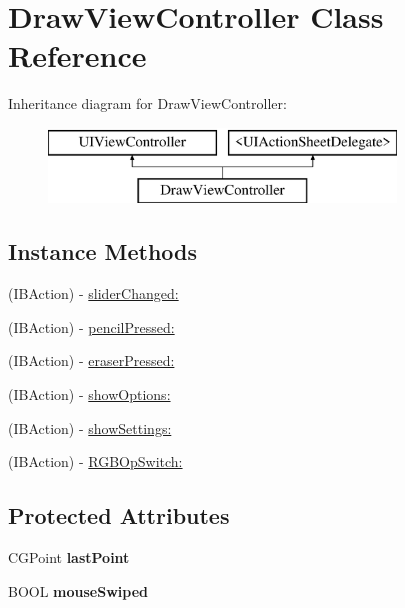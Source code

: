 \hypertarget{interface_draw_view_controller}{\section{Draw\-View\-Controller Class Reference}
\label{interface_draw_view_controller}
}
Inheritance diagram for Draw\-View\-Controller\-:\begin{figure}[H]
\begin{center}
\leavevmode
\includegraphics[height=2.000000cm]{interface_draw_view_controller}
\end{center}
\end{figure}
\subsection*{Instance Methods}
\begin{DoxyCompactItemize}
\item 
(I\-B\-Action) -\/ \hyperlink{interface_draw_view_controller_a568f97b4f1c23ffbc358696f08cb9928}{slider\-Changed\-:}
\item 
(I\-B\-Action) -\/ \hyperlink{interface_draw_view_controller_acb4ad40ab91a94c4ba24f8f8d594c582}{pencil\-Pressed\-:}
\item 
(I\-B\-Action) -\/ \hyperlink{interface_draw_view_controller_a47612faeeec7d9917c189d2b7be6fddb}{eraser\-Pressed\-:}
\item 
(I\-B\-Action) -\/ \hyperlink{interface_draw_view_controller_ae29ed7a7da5174f1de337871915b3398}{show\-Options\-:}
\item 
(I\-B\-Action) -\/ \hyperlink{interface_draw_view_controller_abf8c69aaae512ca77fcca19d433fd9d6}{show\-Settings\-:}
\item 
(I\-B\-Action) -\/ \hyperlink{interface_draw_view_controller_a99821dfa5bdc16fe7746f089e01985c2}{R\-G\-B\-Op\-Switch\-:}
\end{DoxyCompactItemize}
\subsection*{Protected Attributes}
\begin{DoxyCompactItemize}
\item 
\hypertarget{interface_draw_view_controller_a1404bf705364fb43e9b06c9b5a0d17c5}{C\-G\-Point {\bfseries last\-Point}}\label{interface_draw_view_controller_a1404bf705364fb43e9b06c9b5a0d17c5}

\item 
\hypertarget{interface_draw_view_controller_a159b97be9fdf4aaf9bff8a5e25d89770}{B\-O\-O\-L {\bfseries mouse\-Swiped}}\label{interface_draw_view_controller_a159b97be9fdf4aaf9bff8a5e25d89770}

\end{DoxyCompactItemize}
